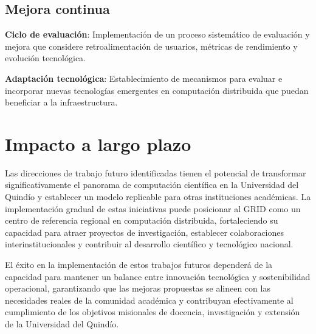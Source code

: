 \subsection{Mejora continua}
\noindent

\textbf{Ciclo de evaluación}: Implementación de un proceso sistemático de evaluación y mejora que considere retroalimentación de usuarios, métricas de rendimiento y evolución tecnológica.

\textbf{Adaptación tecnológica}: Establecimiento de mecanismos para evaluar e incorporar nuevas tecnologías emergentes en computación distribuida que puedan beneficiar a la infraestructura.

\section{Impacto a largo plazo}
\noindent

Las direcciones de trabajo futuro identificadas tienen el potencial de transformar significativamente el panorama de computación científica en la Universidad del Quindío y establecer un modelo replicable para otras instituciones académicas. La implementación gradual de estas iniciativas puede posicionar al GRID como un centro de referencia regional en computación distribuida, fortaleciendo su capacidad para atraer proyectos de investigación, establecer colaboraciones interinstitucionales y contribuir al desarrollo científico y tecnológico nacional.

El éxito en la implementación de estos trabajos futuros dependerá de la capacidad para mantener un balance entre innovación tecnológica y sostenibilidad operacional, garantizando que las mejoras propuestas se alineen con las necesidades reales de la comunidad académica y contribuyan efectivamente al cumplimiento de los objetivos misionales de docencia, investigación y extensión de la Universidad del Quindío.
